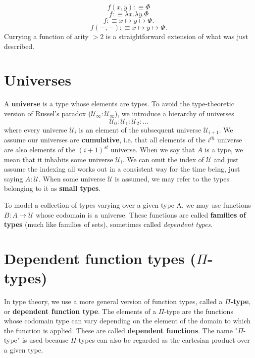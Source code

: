 \documentclass[letterpaper, 10 pt, conference]{ieeeconf}  %
\begin{document}
\begin{equation}
    f(x, y) :\equiv \Phi 
\end{equation}
\begin{equation}
    f :\equiv \lambda x. \lambda y. \Phi
\end{equation}
\begin{equation}
    f :\equiv x \mapsto y \mapsto \Phi.
\end{equation}
\begin{equation}
    f(-,-) :\equiv x \mapsto y \mapsto \Phi.
\end{equation}
Currying a function of arity $> 2$ is a straightforward extension of what was just described.

\section{Universes}

A \textbf{universe} is a type whose elements are types. To avoid the type-theoretic version of Russel's paradox ($\mathcal{U}_{\infty} : \mathcal{U}_{\infty}$), we introduce a hierarchy of universes 
\begin{equation}
    \mathcal{U}_0 : \mathcal{U}_1 : \mathcal{U}_2 : \ldots
\end{equation}
where every universe $\mathcal{U}_i$ is an element of the subsequent universe $\mathcal{U}_{i+1}$. We assume our universes are \textbf{cumulative}, i.e. that all elements of the $i^{th}$ universe are also elements of the $(i+1)^{st}$ universe. When we say that $A$ is a type, we mean that it inhabits some universe $\mathcal{U}_i$. We can omit the index of $\mathcal{U}$ and just assume the indexing all works out in a consistent way for the time being, just saying $A : \mathcal{U}$. When some universe $\mathcal{U}$ is assumed, we may refer to the types belonging to it as \textbf{small types}.

To model a collection of types varying over a given type A, we may use functions $B: A \rightarrow \mathcal{U}$ whose codomain is a universe. These functions are called \textbf{families of types} (much like families of sets), sometimes called \textit{dependent types}.

\section{Dependent function types ($\Pi$-types)}

In type theory, we use a more general version of function types, called a $\Pi$\textbf{-type}, or \textbf{dependent function type}. The elements of a $\Pi$-type are the functions whose codomain type can vary depending on the element of the domain to which the function is applied. These are called \textbf{dependent functions}. The name "$\Pi$-type" is used because $\Pi$-types can also be regarded as the cartesian product over a given type.
\end{document}
